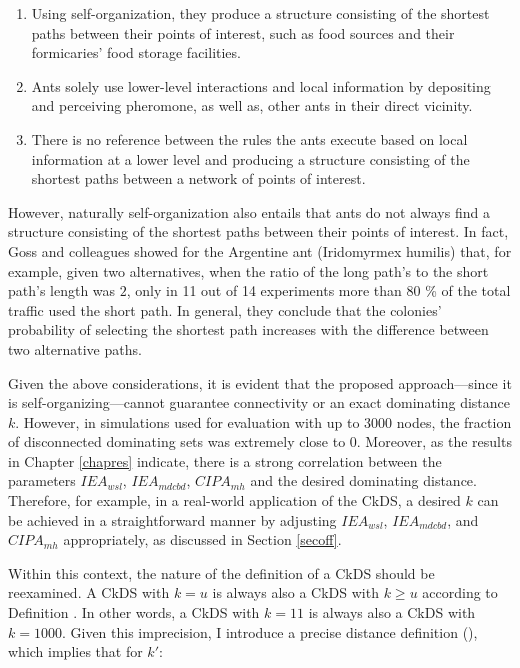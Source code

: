 \begin{enumerate}

\item Using self-organization, they produce a structure consisting of the shortest paths between their points of interest, such as food sources and their formicaries' food storage facilities.

\item Ants solely use lower-level interactions and local information by depositing and perceiving pheromone, as well as, other ants in their direct vicinity.

\item There is no reference between the rules the ants execute based on local information at a lower level and producing a structure consisting of the shortest paths between a network of points of interest.

\end{enumerate}

However, naturally self-organization also entails that ants do not always find a structure consisting of the shortest paths between their points of interest. In fact, Goss and colleagues showed for the Argentine ant (Iridomyrmex humilis) \cite{gossADP89shortcuts} that, for example, given two alternatives, when the ratio of the long path's to the short path's length was $2$, only in 11 out of 14 experiments more than 80 \% of the total traffic used the short path. In general, they conclude that the colonies' probability of selecting the shortest path increases with the difference between two alternative paths.

\begin{sloppypar}
Given the above considerations, it is evident that the proposed approach---since it is self-organizing---cannot guarantee connectivity or an exact dominating distance $k$. However, in simulations used for evaluation with up to 3000 nodes, the fraction of disconnected dominating sets was extremely close to 0. Moreover, as the results in Chapter \ref{chapres} indicate, there is a strong correlation between the parameters $IEA_{wsl}$, $IEA_{mdcbd}$, $CIPA_{mh}$ and the desired dominating distance. Therefore, for example, in a real-world application of the CkDS, a desired $k$ can be achieved in a straightforward manner by adjusting $IEA_{wsl}$, $IEA_{mdcbd}$, and $CIPA_{mh}$ appropriately, as discussed in Section \ref{secoff}.
\end{sloppypar}


Within this context, the nature of the definition of a CkDS should be reexamined. A CkDS with $k=u$ is always also a CkDS with $k\geq u$ according to Definition . In other words, a CkDS with $k=11$ is always also a CkDS with $k=1000$. Given this imprecision, I introduce a precise distance definition (), which implies that for $k'$:

